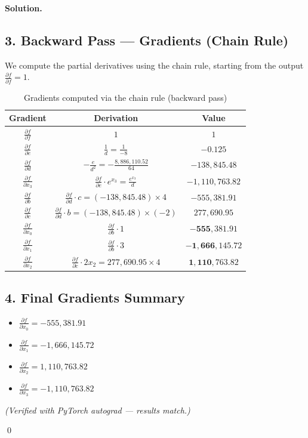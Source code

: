 \documentclass[10pt, a4paper]{article}
\newenvironment{Solution}{\textbf{Solution.}}{\qed}
\begin{document}
\begin{Solution}
\subsection*{3. Backward Pass --- Gradients (Chain Rule)}

We compute the partial derivatives using the chain rule, starting from the output $\frac{\partial f}{\partial f} = 1$.

\begin{table}[H]
\centering
\caption{Gradients computed via the chain rule (backward pass)}
\begin{tabular}{ccc}
\toprule
\textbf{Gradient} & \textbf{Derivation} & \textbf{Value} \\
\midrule
$\frac{\partial f}{\partial f}$ & $1$ & $1$ \\[4pt]
$\frac{\partial f}{\partial e}$ & $\frac{1}{d} = \frac{1}{-8}$ & $-0.125$ \\[4pt]
$\frac{\partial f}{\partial d}$ & $-\frac{e}{d^2} = -\frac{8{,}886{,}110.52}{64}$ & $-138{,}845.48$ \\[4pt]
$\frac{\partial f}{\partial x_3}$ & $\frac{\partial f}{\partial e} \cdot e^{x_3} = \frac{e^{x_3}}{d}$ & $-1{,}110{,}763.82$ \\[4pt]
$\frac{\partial f}{\partial b}$ & $\frac{\partial f}{\partial d} \cdot c = (-138{,}845.48) \times 4$ & $-555{,}381.91$ \\[4pt]
$\frac{\partial f}{\partial c}$ & $\frac{\partial f}{\partial d} \cdot b = (-138{,}845.48) \times (-2)$ & $277{,}690.95$ \\[4pt]
$\frac{\partial f}{\partial x_0}$ & $\frac{\partial f}{\partial b} \cdot 1$ & $\mathbf{-555{,}381.91}$ \\[4pt]
$\frac{\partial f}{\partial x_1}$ & $\frac{\partial f}{\partial b} \cdot 3$ & $\mathbf{-1{,}666{,}145.72}$ \\[4pt]
$\frac{\partial f}{\partial x_2}$ & $\frac{\partial f}{\partial c} \cdot 2x_2 = 277{,}690.95 \times 4$ & $\mathbf{1{,}110{,}763.82}$ \\[4pt]
\bottomrule
\end{tabular}
\end{table}

\subsection*{4. Final Gradients Summary}
\begin{itemize}[nosep]
\item $\frac{\partial f}{\partial x_0} = -555{,}381.91$
\item $\frac{\partial f}{\partial x_1} = -1{,}666{,}145.72$
\item $\frac{\partial f}{\partial x_2} = 1{,}110{,}763.82$
\item $\frac{\partial f}{\partial x_3} = -1{,}110{,}763.82$
\end{itemize}

\noindent\textit{(Verified with PyTorch autograd --- results match.)}

\end{Solution}
\end{document}
